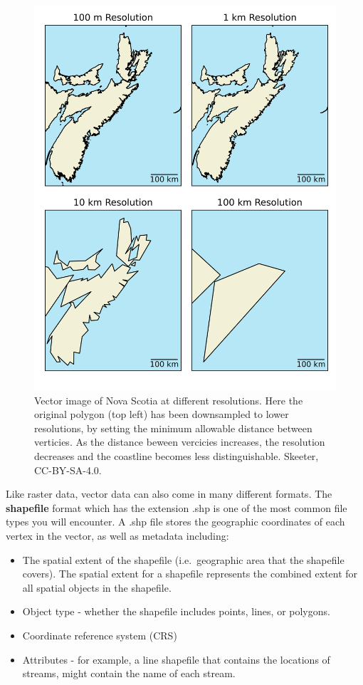 \documentclass[
]{book}
\providecommand{\tightlist}{%
  \setlength{\itemsep}{0pt}\setlength{\parskip}{0pt}}
\begin{document}
\begin{figure}
\includegraphics[width=0.75\linewidth]{images/03-vector-resolution} \caption{Vector image of Nova Scotia at different resolutions.  Here the original polygon (top left) has been downsampled to lower resolutions, by setting the minimum allowable distance between verticies.  As the distance beween vercicies increases, the resolution decreases and the coastline becomes less distinguishable. Skeeter, CC-BY-SA-4.0.}\label{fig:3-vector-resolution}
\end{figure}

Like raster data, vector data can also come in many different formats. The \textbf{shapefile} format which has the extension .shp is one of the most common file types you will encounter. A .shp file stores the geographic coordinates of each vertex in the vector, as well as metadata including:

\begin{itemize}
\tightlist
\item
  The spatial extent of the shapefile (i.e.~geographic area that the shapefile covers). The spatial extent for a shapefile represents the combined extent for all spatial objects in the shapefile.
\item
  Object type - whether the shapefile includes points, lines, or polygons.
\item
  Coordinate reference system (CRS)
\item
  Attributes - for example, a line shapefile that contains the locations of streams, might contain the name of each stream.
\end{itemize}
\end{document}
